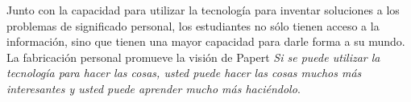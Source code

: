 \begin{description}
	Junto con la capacidad para utilizar la tecnología para inventar
	soluciones a los problemas de significado personal, los estudiantes no
	sólo tienen acceso a la información, sino que tienen una mayor capacidad
	para darle forma a su mundo. La fabricación personal promueve la visión
	de Papert \emph{Si se puede utilizar la tecnología para hacer las cosas,
		usted puede hacer las cosas muchos más interesantes y usted
		puede aprender mucho más haciéndolo}\cite{papertian:const}.

\end{description}


